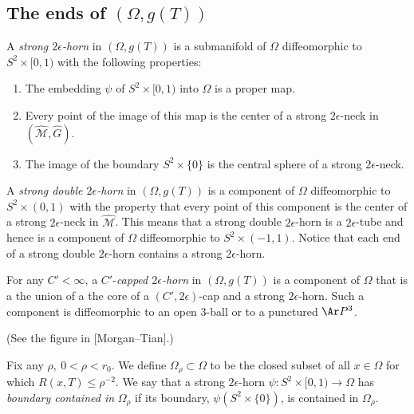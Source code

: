 \subsection{The ends of $(\Omega,g(T))$}





\begin{definition}
\label{def:strong-epsilon-horn}
 A {\em strong $2\epsilon$-horn} in $(\Omega,g(T))$ is a submanifold of $\Omega$ diffeomorphic
to $S^2\times [0,1)$ with the following properties:
\begin{enumerate}
\item[(1)] The embedding $\psi$ of $S^2\times [0,1)$ into $\Omega$ is a proper map.
\item[(2)] Every point of  the image of this map is the center of a strong
$2\epsilon$-neck in $(\widehat{\mathcal M},\widehat G)$.
\item[(3)] The image of the boundary $S^2\times \{0\}$
is the central sphere of a strong $2\epsilon$-neck.
\end{enumerate}
\end{definition}


\begin{definition}
\label{def:strong-double-and-capped-horn}
 A {\em strong double $2\epsilon$-horn} in
$(\Omega,g(T))$ is a component of $\Omega$ diffeomorphic to
$S^2\times (0,1)$ with the property that every point of this
component is the center of a strong $2\epsilon$-neck in $\widehat
{\mathcal M}$. This means that a strong double $2\epsilon$-horn is a
$2\epsilon$-tube and hence is a component of $\Omega$ diffeomorphic
to $S^2\times(-1,1)$. Notice that each end of a strong double
$2\epsilon$-horn contains a strong $2\epsilon$-horn.

 For any $C'<\infty$, a $C'$-{\em capped
$2\epsilon$-horn} in $(\Omega,g(T))$ is a
component of $\Omega$ that is a the union of a the core of a
$(C',2\epsilon)$-cap and a strong $2\epsilon$-horn. Such a component
is diffeomorphic to an open $3$-ball or to a punctured $\Ar P^3$.
\end{definition}

(See the figure in [Morgan--Tian].)


\begin{definition}
\label{def:omega-rho}
Fix any $\rho,\ 0<\rho<r_0$. We define $\Omega_\rho\subset \Omega$
to be the closed subset of all $x\in \Omega$ for which $R(x,T)\le
\rho^{-2}$. We say that a strong $2\epsilon$-horn $\psi\colon
S^2\times[0,1)\to \Omega$ has {\em boundary contained in}
$\Omega_\rho$ if its boundary,
$\psi(S^2\times\{0\})$, is contained in $\Omega_\rho$.
\end{definition}

